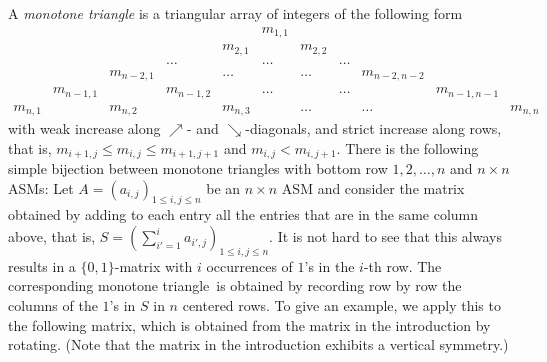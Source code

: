 \documentclass[12pt]{amsart}
\theoremstyle{definition}
\numberwithin{equation}{section}
\begin{document}
A \emph{monotone triangle} is a triangular array of integers of the following form 
\[
\begin{array}{ccccccccccc}
    &   &   &   &   & m_{1,1} &   &   &   &   & \\
    &   &   &   & m_{2,1} &   & m_{2,2} &   &   &   & \\
    &   &   & \dots &   & \dots &   & \dots &   &   & \\
    &   & m_{n-2,1} &   & \dots &   & \dots &   & m_{n-2,n-2} &   & \\
    & m_{n-1,1} &   & m_{n-1,2} &  &   \dots &   & \dots   &  & m_{n-1,n-1}  & \\
    m_{n,1} &   & m_{n,2} &   & m_{n,3} &   & \dots &   & \dots &   & m_{n,n}
\end{array}
\]
with weak increase along $\nearrow$- and $\searrow$-diagonals, and strict increase along rows, that is, $m_{i+1,j} \le m_{i,j} \le m_{i+1,j+1}$ and 
$m_{i,j} < m_{i,j+1}$. There is the following simple bijection between monotone triangles with bottom row $1,2,\ldots,n$ and $n \times n$ ASMs: Let $A=(a_{i,j})_{1 \le i,j \le n}$ be an $n \times n$ ASM and consider the matrix obtained by adding to each entry all the entries that are in the same column above, that is, $S=(\sum_{i'=1}^{i} a_{i',j})_{1 \le i, j \le n}$. It is not hard to see that this always results in a $\{0,1\}$-matrix with $i$ occurrences of $1$'s in the $i$-th row. The corresponding {monotone triangle} is obtained by recording row by row the columns of the $1$'s in $S$ in $n$ centered rows. To give an example, we apply this to the following matrix, which is obtained from the matrix in the introduction by rotating. (Note that the matrix in the introduction exhibits a vertical symmetry.) 
\end{document}
